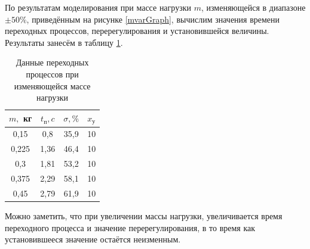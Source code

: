 \documentclass[fleqn, a4paper, 11pt, russian]{article}
\begin{document}
	\newpage
	По результатам моделирования при массе нагрузки $m$, изменяющейся в диапазоне $\pm50\%$, приведённым на рисунке \ref{mvarGraph}, вычислим значения времени переходных процессов, перерегулирования и установившейся величины. Результаты занесём в таблицу \ref{mvarTab}.
	\begin{table}[ht!]
		\caption{Данные переходных процессов при изменяющейся массе нагрузки}
		\begin{tabular}{|c|c|c|c|}
			\hline
			$m,$ кг	& $t_\text{п}, c$	& $\sigma, \%$	& $x_\text{у}$\\
			\hline
			0,15	& 0,8				& 35,9			& 10\\
			\hline
			0,225	& 1,36				& 46,4			& 10\\
			\hline
			0,3		& 1,81				& 53,2			& 10\\
			\hline
			0,375	& 2,29				& 58,1			& 10\\
			\hline
			0,45	& 2,79				& 61,9			& 10\\
			\hline
		\end{tabular}
		\label{mvarTab}
	\end{table}
	
	Можно заметить, что при увеличении массы нагрузки, увеличивается время переходного процесса и значение перерегулирования, в то время как установившееся значение остаётся неизменным.
	\clearpage
\end{document}
